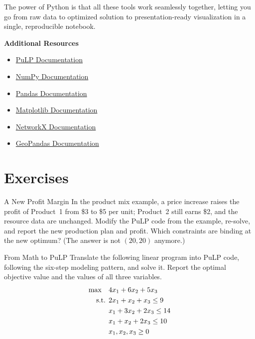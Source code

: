 The power of Python is that all these tools work seamlessly together, letting you go from raw data to optimized solution to presentation-ready visualization in a single, reproducible notebook.

\begin{resource}
\textbf{Additional Resources}
\begin{itemize}
\item \href{https://coin-or.github.io/pulp/}{PuLP Documentation}
\item \href{https://numpy.org/doc/}{NumPy Documentation}
\item \href{https://pandas.pydata.org/docs/}{Pandas Documentation}
\item \href{https://matplotlib.org/stable/contents.html}{Matplotlib Documentation}
\item \href{https://networkx.org/documentation/}{NetworkX Documentation}
\item \href{https://geopandas.org/}{GeoPandas Documentation}
\end{itemize}
\end{resource}

\section{Exercises}


\begin{ex}{A New Profit Margin}{}
\label{ex:pulp-new-profit}
In the product mix example, a price increase raises the profit of Product~1 from \$3 to \$5 per unit; Product~2 still earns \$2, and the resource data are unchanged. Modify the PuLP code from the example, re-solve, and report the new production plan and profit. Which constraints are binding at the new optimum? (The answer is not $(20, 20)$ anymore.)
\end{ex}

\begin{ex}{From Math to PuLP}{}
\label{ex:pulp-translate}
Translate the following linear program into PuLP code, following the six-step modeling pattern, and solve it. Report the optimal objective value and the values of all three variables.
\begin{align*}
\max \quad & 4x_1 + 6x_2 + 5x_3 \\
\text{ s.t. }        & 2x_1 + x_2 + x_3 \leq 9 \\
& x_1 + 3x_2 + 2x_3 \leq 14 \\
& x_1 + x_2 + 2x_3 \leq 10 \\
& x_1, x_2, x_3 \geq 0
\end{align*}
\end{ex}

